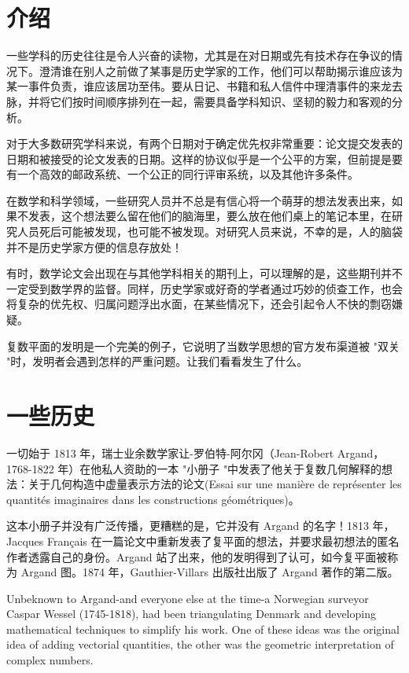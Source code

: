 \section{介绍}
一些学科的历史往往是令人兴奋的读物，尤其是在对日期或先有技术存在争议的情况下。澄清谁在别人之前做了某事是历史学家的工作，他们可以帮助揭示谁应该为某一事件负责，谁应该居功至伟。要从日记、书籍和私人信件中理清事件的来龙去脉，并将它们按时间顺序排列在一起，需要具备学科知识、坚韧的毅力和客观的分析。

对于大多数研究学科来说，有两个日期对于确定优先权非常重要：论文提交发表的日期和被接受的论文发表的日期。这样的协议似乎是一个公平的方案，但前提是要有一个高效的邮政系统、一个公正的同行评审系统，以及其他许多条件。

在数学和科学领域，一些研究人员并不总是有信心将一个萌芽的想法发表出来，如果不发表，这个想法要么留在他们的脑海里，要么放在他们桌上的笔记本里，在研究人员死后可能被发现，也可能不被发现。对研究人员来说，不幸的是，人的脑袋并不是历史学家方便的信息存放处！

有时，数学论文会出现在与其他学科相关的期刊上，可以理解的是，这些期刊并不一定受到数学界的监督。同样，历史学家或好奇的学者通过巧妙的侦查工作，也会将复杂的优先权、归属问题浮出水面，在某些情况下，还会引起令人不快的剽窃嫌疑。

复数平面的发明是一个完美的例子，它说明了当数学思想的官方发布渠道被 "双关 "时，发明者会遇到怎样的严重问题。让我们看看发生了什么。

\section{一些历史}
一切始于 1813 年，瑞士业余数学家让-罗伯特-阿尔冈（Jean-Robert Argand，1768-1822 年）在他私人资助的一本 "小册子 "中发表了他关于复数几何解释的想法：关于几何构造中虚量表示方法的论文(Essai sur une manière de représenter les quantités imaginaires dans les constructions géométriques)\cite{bib4-1}。

这本小册子并没有广泛传播，更糟糕的是，它并没有 Argand 的名字！1813 年，Jacques Français 在一篇论文中重新发表了复平面的想法，并要求最初想法的匿名作者透露自己的身份。Argand 站了出来，他的发明得到了认可，如今复平面被称为 Argand 图。1874 年，Gauthier-Villars 出版社出版了 Argand 著作的第二版\cite{bib4-2}。

Unbeknown to Argand-and everyone else at the time-a Norwegian surveyor Caspar Wessel (1745-1818), had been triangulating Denmark and developing mathematical techniques to simplify his work. One of these ideas was the original idea of adding vectorial quantities, the other was the geometric interpretation of complex numbers.

